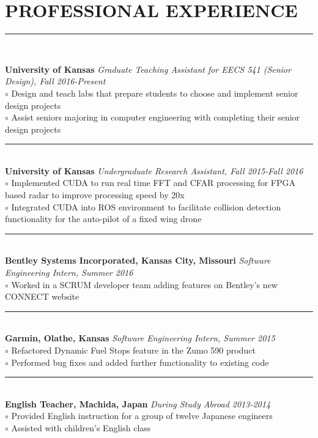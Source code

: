 \documentclass[twoside]{article}
\begin{document}
\section*{PROFESSIONAL EXPERIENCE}
\vspace{-1em}
\rule{\textwidth}{1pt}\\
\begin{adjustwidth}{0.2in}{0in}
\vspace{-1em}
\textbf{University of Kansas} \hfill \textit{Graduate Teaching Assistant for EECS 541 (Senior Design), Fall 2016-Present}\\
$\circ$ Design and teach labs that prepare students to choose and implement senior design projects\\
$\circ$ Assist seniors majoring in computer engineering with completing their senior design projects\\
\rule{7.3in}{0.5pt}\\
\textbf{University of Kansas} \hfill \textit{Undergraduate Research Assistant, Fall 2015-Fall 2016}\\
$\circ$ Implemented CUDA to run real time FFT and CFAR processing for FPGA based radar to improve processing speed by 20x\\
$\circ$ Integrated CUDA into ROS environment to facilitate collision detection functionality for the auto-pilot of a fixed wing drone\\
\rule{7.3in}{0.5pt}\\
\textbf{Bentley Systems Incorporated, Kansas City, Missouri} \hfill \textit{Software Engineering Intern, Summer 2016}\\
$\circ$ Worked in a SCRUM developer team adding features on Bentley's new CONNECT website\\
\rule{7.3in}{0.5pt}\\
\textbf{Garmin, Olathe, Kansas} \hfill \textit{Software Engineering Intern, Summer 2015}\\
$\circ$ Refactored Dynamic Fuel Stops feature in the Zumo 590 product\\
$\circ$ Performed bug fixes and added further functionality to existing code\\
\rule{7.3in}{0.5pt}\\
\textbf{English Teacher, Machida, Japan} \hfill \textit{During Study Abroad 2013-2014}\\
$\circ$ Provided English instruction for a group of twelve Japanese engineers\\
$\circ$ Assisted with children's English class\\

\end{adjustwidth}
\end{document}
